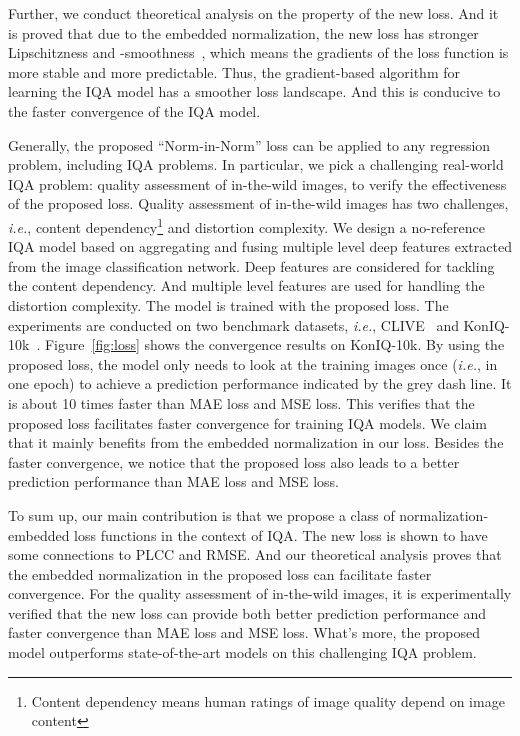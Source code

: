 \documentclass[sigconf]{acmart}
\begin{document}
Further, we conduct theoretical analysis on the property of the new loss. 
And it is proved that due to the embedded normalization, the new loss has stronger Lipschitzness and -smoothness~\cite{nesterov2013introductory}, which means the gradients of the loss function is more stable and more predictable. 
Thus, the gradient-based algorithm for learning the IQA model has a smoother loss landscape.
And this is conducive to the faster convergence of the IQA model.

Generally, the proposed ``Norm-in-Norm'' loss can be applied to any regression problem, including IQA problems.
In particular, we pick a challenging real-world IQA problem: quality assessment of in-the-wild images, to verify the effectiveness of the proposed loss.
Quality assessment of in-the-wild images has two challenges, \textit{i.e.}, content dependency\footnote{Content dependency means human ratings of image quality depend on image content} and distortion complexity.
We design a no-reference IQA model based on aggregating and fusing multiple level deep features extracted from the image classification network.
Deep features are considered for tackling the content dependency. 
And multiple level features are used for handling the distortion complexity.
The model is trained with the proposed loss. 
The experiments are conducted on two benchmark datasets, \textit{i.e.}, CLIVE~\cite{ghadiyaram2016massive} and KonIQ-10k~\cite{hosu2019koniq}.
Figure~\ref{fig:loss} shows the convergence results on KonIQ-10k.
By using the proposed loss, the model only needs to look at the training images once (\textit{i.e.}, in one epoch) to achieve a prediction performance indicated by the grey dash line.
It is about 10 times faster than MAE loss and MSE loss.
This verifies that the proposed loss facilitates faster convergence for training IQA models.
We claim that it mainly benefits from the embedded normalization in our loss.
Besides the faster convergence, we notice that the proposed loss also leads to a better prediction performance than MAE loss and MSE loss.

To sum up, our main contribution is that we propose a class of normalization-embedded loss functions in the context of IQA.
The new loss is shown to have some connections to PLCC and RMSE.
And our theoretical analysis proves that the embedded normalization in the proposed loss can facilitate faster convergence.
For the quality assessment of in-the-wild images, it is experimentally verified that the new loss can provide both better prediction performance and faster convergence than MAE loss and MSE loss. 
What's more, the proposed model outperforms state-of-the-art models on this challenging IQA problem.
\end{document}

